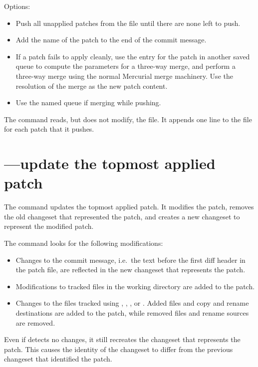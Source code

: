 Options:
\begin{itemize}
\item[\hgxopt{mq}{qpush}{-a}] Push all unapplied patches from the
   file until there are none left to push.
\item[\hgxopt{mq}{qpush}{-l}] Add the name of the patch to the end
  of the commit message.
\item[\hgxopt{mq}{qpush}{-m}] If a patch fails to apply cleanly, use the
  entry for the patch in another saved queue to compute the parameters
  for a three-way merge, and perform a three-way merge using the
  normal Mercurial merge machinery.  Use the resolution of the merge
  as the new patch content.
\item[\hgxopt{mq}{qpush}{-n}] Use the named queue if merging while pushing.
\end{itemize}

The  command reads, but does not modify, the
 file.  It appends one line to the 
file for each patch that it pushes.

\section{---update the topmost applied patch}

The  command updates the topmost applied patch.  It
modifies the patch, removes the old changeset that represented the
patch, and creates a new changeset to represent the modified patch.

The  command looks for the following modifications:
\begin{itemize}
\item Changes to the commit message, i.e.~the text before the first
  diff header in the patch file, are reflected in the new changeset
  that represents the patch.
\item Modifications to tracked files in the working directory are
  added to the patch.
\item Changes to the files tracked using , ,
  , or .  Added files and copy and rename
  destinations are added to the patch, while removed files and rename
  sources are removed.
\end{itemize}

Even if  detects no changes, it still recreates the
changeset that represents the patch.  This causes the identity of the
changeset to differ from the previous changeset that identified the
patch.

